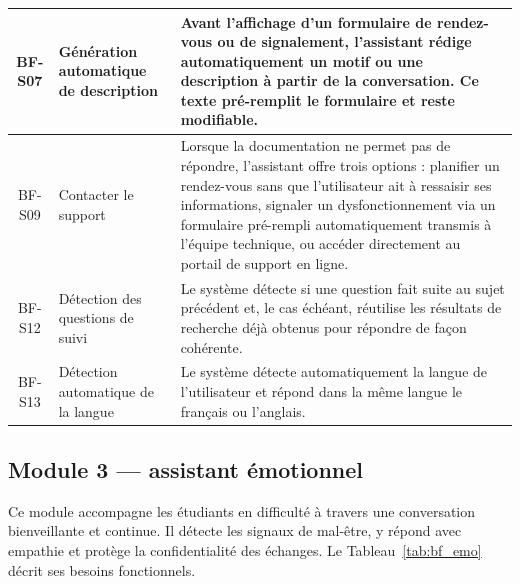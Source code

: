 \begin{table}[H]
\begin{tabular}{|c|p{3.5cm}|p{9.5cm}|}
\hline
BF-S07 & Génération automatique de description
        & Avant l'affichage d'un formulaire de rendez-vous ou de signalement, l'assistant rédige automatiquement un motif ou une description à partir de la conversation. Ce texte pré-remplit le formulaire et reste modifiable. \\
\hline
BF-S09 & Contacter le support
        & Lorsque la documentation ne permet pas de répondre, l'assistant offre trois options : planifier un rendez-vous sans que l'utilisateur ait à ressaisir ses informations, signaler un dysfonctionnement via un formulaire pré-rempli automatiquement transmis à l'équipe technique, ou accéder directement au portail de support en ligne. \\
\hline
BF-S12 & Détection des questions de suivi
        & Le système détecte si une question fait suite au sujet précédent et, le cas échéant, réutilise les résultats de recherche déjà obtenus pour répondre de façon cohérente. \\
\hline
BF-S13 & Détection automatique de la langue
        & Le système détecte automatiquement la langue de l'utilisateur et répond dans la même langue le français ou l'anglais. \\
\hline
\end{tabular}
\end{table}

\subsection{Module 3 — assistant émotionnel}

Ce module accompagne les étudiants en difficulté à travers une conversation bienveillante et continue.
Il détecte les signaux de mal-être, y répond avec empathie et protège la confidentialité des échanges.
Le Tableau~\ref{tab:bf_emo} décrit ses besoins fonctionnels.

